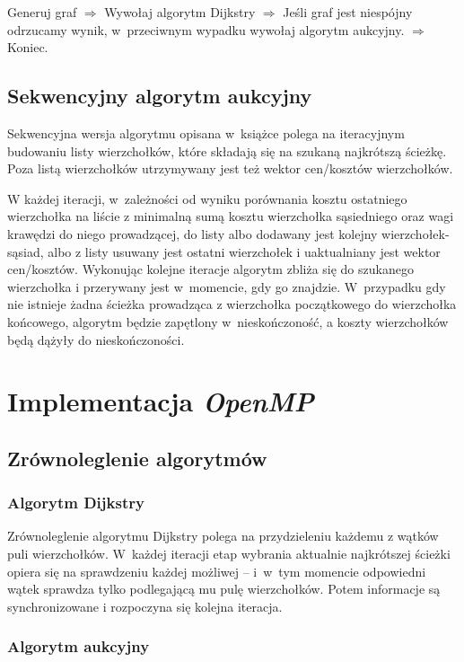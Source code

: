 \documentclass {report}
\begin{document}
Generuj graf $\Rightarrow$ Wywołaj algorytm Dijkstry $\Rightarrow$ Jeśli graf jest niespójny odrzucamy wynik, w~przeciwnym wypadku wywołaj algorytm aukcyjny. $\Rightarrow$ Koniec.

\section{Sekwencyjny algorytm aukcyjny}

Sekwencyjna wersja algorytmu opisana w~książce \cite{Bertsekas1998} polega na iteracyjnym budowaniu listy wierzchołków, które składają się na szukaną najkrótszą ścieżkę. Poza listą wierzchołków utrzymywany jest też wektor cen/kosztów wierzchołków.

W każdej iteracji, w~zależności od wyniku porównania kosztu ostatniego wierzchołka na liście z minimalną sumą kosztu wierzchołka sąsiedniego oraz wagi krawędzi do niego prowadzącej, do listy albo dodawany jest kolejny wierzchołek-sąsiad, albo z listy usuwany jest ostatni wierzchołek i uaktualniany jest wektor cen/kosztów. Wykonując kolejne iteracje algorytm zbliża się do szukanego wierzchołka i przerywany jest w~momencie, gdy go znajdzie. W~przypadku gdy nie istnieje żadna ścieżka prowadząca z wierzchołka początkowego do wierzchołka końcowego, algorytm będzie zapętlony w~nieskończoność, a koszty wierzchołków będą dążyły do nieskończoności.

\chapter{Implementacja \emph{OpenMP}}

\section{Zrównoleglenie algorytmów}

\subsection{Algorytm Dijkstry}

Zrównoleglenie algorytmu Dijkstry polega na przydzieleniu każdemu z wątków puli wierzchołków. W~każdej iteracji etap wybrania aktualnie najkrótszej ścieżki opiera się na sprawdzeniu każdej możliwej -- i~w~tym momencie odpowiedni wątek sprawdza tylko podlegającą mu pulę wierzchołków. Potem informacje są synchronizowane i rozpoczyna się kolejna iteracja.

\subsection{Algorytm aukcyjny}
\end{document}
